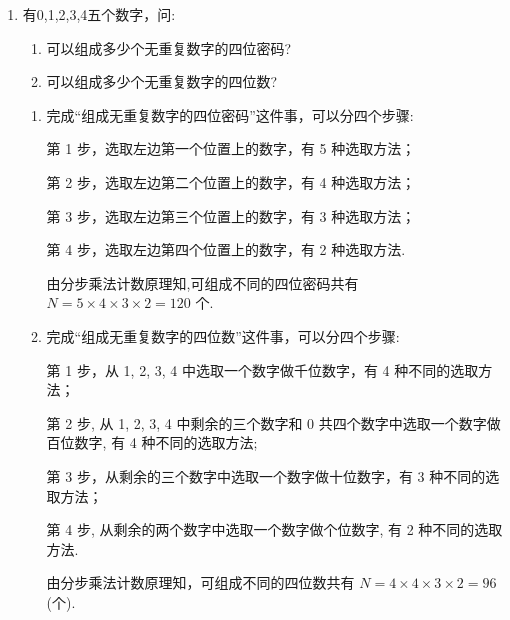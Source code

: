 \begin{enumerate}
\begin{enumerate}
\begin{jieda}
\begin{enumerate}
                \item 5 个同学争夺 3 个比赛的冠军，冠军获得情况共有 $5 \times  5 \times  5 = {5}^{3} = {125}$ 种.
            \end{enumerate}
        \end{jieda}

        \item 有0,1,2,3,4五个数字，问:
        \begin{enumerate}
            \item 可以组成多少个无重复数字的四位密码?
            \item 可以组成多少个无重复数字的四位数?
        \end{enumerate}
        \begin{jieda}
            \begin{enumerate}
                \item 完成“组成无重复数字的四位密码”这件事，可以分四个步骤:
                
                第 1 步，选取左边第一个位置上的数字，有 5 种选取方法；
                
                第 2 步，选取左边第二个位置上的数字，有 4 种选取方法；
                
                第 3 步，选取左边第三个位置上的数字，有 3 种选取方法；
                
                第 4 步，选取左边第四个位置上的数字，有 2 种选取方法.
                
                由分步乘法计数原理知,可组成不同的四位密码共有 $N = 5 \times  4 \times  3 \times  2 = {120}$ 个.

                \item 完成“组成无重复数字的四位数”这件事，可以分四个步骤:

                第 1 步，从 1, 2, 3, 4 中选取一个数字做千位数字，有 4 种不同的选取方法；
                
                第 2 步, 从 1, 2, 3, 4 中剩余的三个数字和 0 共四个数字中选取一个数字做百位数字, 有 4 种不同的选取方法;
                
                第 3 步，从剩余的三个数字中选取一个数字做十位数字，有 3 种不同的选取方法；
                
                第 4 步, 从剩余的两个数字中选取一个数字做个位数字, 有 2 种不同的选取方法.
                
                由分步乘法计数原理知，可组成不同的四位数共有 $N = 4 \times  4 \times  3 \times  2 = {96}$ (个).
            \end{enumerate}
        \end{jieda}
        

\end{enumerate}
\end{enumerate}
